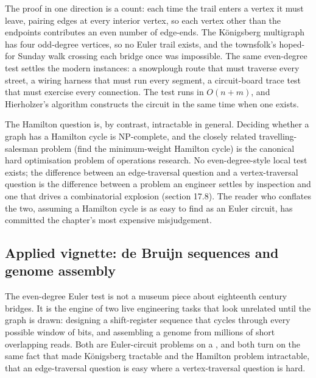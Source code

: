 The proof in one direction is a count: each time the trail enters a
vertex it must leave, pairing edges at every interior vertex, so
each vertex other than the endpoints contributes an even number of
edge-ends. The K\"{o}nigsberg multigraph has four odd-degree
vertices, so no Euler trail exists, and the townsfolk's hoped-for
Sunday walk crossing each bridge once was impossible. The same
even-degree test settles the modern instances: a snowplough route
that must traverse every street, a wiring harness that must run
every segment, a circuit-board trace test that must exercise every
connection. The test runs in $O(n + m)$, and Hierholzer's algorithm
constructs the circuit in the same time when one exists.

The Hamilton question is, by contrast, intractable in general.
Deciding whether a graph has a Hamilton cycle is NP-complete, and
the closely related travelling-salesman problem (find the
minimum-weight Hamilton cycle) is the canonical hard optimisation
problem of operations research. No even-degree-style local test
exists; the difference between an edge-traversal question and a
vertex-traversal question is the difference between a problem an
engineer settles by inspection and one that drives a combinatorial
explosion (section 17.8). The reader who conflates the two, assuming
a Hamilton cycle is as easy to find as an Euler circuit, has
committed the chapter's most expensive misjudgement.

\subsection{Applied vignette: de Bruijn sequences and genome
assembly}

The even-degree Euler test is not a museum piece about eighteenth
century bridges. It is the engine of two live engineering tasks that
look unrelated until the graph is drawn: designing a shift-register
sequence that cycles through every possible window of bits, and
assembling a genome from millions of short overlapping reads. Both
are Euler-circuit problems on a , and both
turn on the same fact that made K\"{o}nigsberg tractable and the
Hamilton problem intractable, that an edge-traversal question is easy
where a vertex-traversal question is hard.

